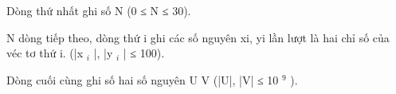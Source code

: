 Dòng thứ nhất ghi số N (0 ≤ N ≤ 30).  

   N dòng tiếp theo, dòng thứ i ghi các số nguyên xi, yi lần lượt là hai chỉ số của véc tơ thứ i. (|x   $_    i   $   |, |y   $_    i   $   | ≤ 100).  

   Dòng cuối cùng ghi số hai số nguyên U V (|U|, |V| ≤ 10   $^    9   $   ).  

\